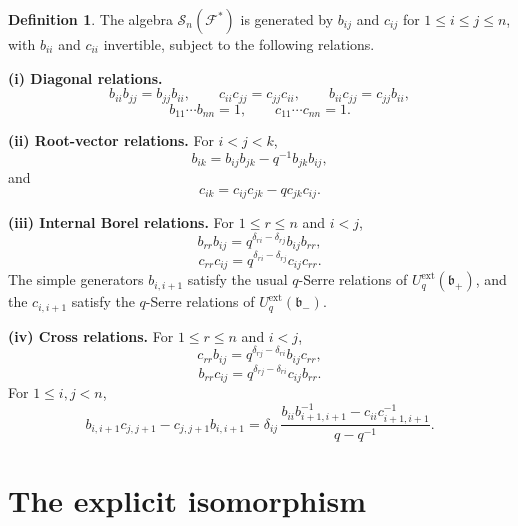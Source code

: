\documentclass[11pt]{article}
\theoremstyle{definition}
\newtheorem{definition}{Definition}
\newcommand{\Uq}{U_q^{\mathrm{ext}}}
\newcommand{\fb}{\mathfrak{b}}
\newcommand{\F}{\mathcal{F}}
\newcommand{\cS}{\mathcal{S}}
\begin{document}
\begin{definition}
\label{def:S}
The algebra $\cS_n(\F^*)$ is generated by $b_{ij}$ and $c_{ij}$ for
$1\le i\le j\le n$, with $b_{ii}$ and $c_{ii}$ invertible, subject to
the following relations.

\smallskip
\noindent\textbf{(i) Diagonal relations.}
\[
b_{ii}b_{jj}=b_{jj}b_{ii},\qquad
c_{ii}c_{jj}=c_{jj}c_{ii},\qquad
b_{ii}c_{jj}=c_{jj}b_{ii},
\]
\[
b_{11}\cdots b_{nn}=1,\qquad c_{11}\cdots c_{nn}=1.
\]

\smallskip
\noindent\textbf{(ii) Root-vector relations.}
For $i<j<k$,
\begin{equation}
\label{eq:S-upper-root}
b_{ik}=b_{ij}b_{jk}-q^{-1}b_{jk}b_{ij},
\end{equation}
and
\begin{equation}
\label{eq:S-lower-root}
c_{ik}=c_{ij}c_{jk}-q c_{jk}c_{ij}.
\end{equation}

\smallskip
\noindent\textbf{(iii) Internal Borel relations.}
For $1\le r\le n$ and $i<j$,
\begin{equation}
\label{eq:S-upper-diag}
b_{rr}b_{ij}=q^{\delta_{ri}-\delta_{rj}}b_{ij}b_{rr},
\end{equation}
\begin{equation}
\label{eq:S-lower-diag}
c_{rr}c_{ij}=q^{\delta_{ri}-\delta_{rj}}c_{ij}c_{rr}.
\end{equation}
The simple generators $b_{i,i+1}$ satisfy the usual $q$-Serre relations of
$\Uq(\fb_+)$, and the $c_{i,i+1}$ satisfy the $q$-Serre relations of
$\Uq(\fb_-)$.

\smallskip
\noindent\textbf{(iv) Cross relations.}
For $1\le r\le n$ and $i<j$,
\begin{equation}
\label{eq:S-cross-cartan}
c_{rr}b_{ij}=q^{\delta_{rj}-\delta_{ri}}b_{ij}c_{rr},
\end{equation}
\begin{equation}
\label{eq:S-cross-cartan2}
b_{rr}c_{ij}=q^{\delta_{rj}-\delta_{ri}}c_{ij}b_{rr}.
\end{equation}
For $1\le i,j<n$,
\begin{equation}
\label{eq:S-simple-comm}
b_{i,i+1}c_{j,j+1}-c_{j,j+1}b_{i,i+1}
=
\delta_{ij}\,
\frac{b_{ii}b_{i+1,i+1}^{-1}-c_{ii}c_{i+1,i+1}^{-1}}
     {q-q^{-1}}.
\end{equation}
\end{definition}

\section{The explicit isomorphism}
\end{document}
